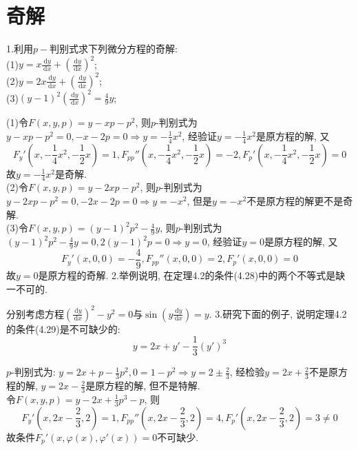 \documentclass[titlepage,11pt,a4paper,twoside]{report}
\makeatletter
\newcommand\diff{\,\mathrm{d}}
\newenvironment{solve}{\par
	\pushQED{\qed}%
	\normalfont \topsep1\p@\@plus6\p@\relax
	\trivlist
	\item\relax
	{\hspace*{\parindent}{\heiti 解}\@addpunct{:}}\hspace\labelsep\ignorespaces
}{%
	\popQED\endtrivlist\@endpefalse
}
\makeatother
\begin{document}
\section{奇解}
1.利用$p-$判别式求下列微分方程的奇解:\\
(1)$\displaystyle y=x\frac{\diff y}{\diff x}+\left(\frac{\diff y}{\diff x}\right)^2$;\\
(2)$\displaystyle y=2x\frac{\diff y}{\diff x}+\left(\frac{\diff y}{\diff x}\right)^2$;\\
(3)$\displaystyle (y-1)^2\left(\frac{\diff y}{\diff x}\right)^2=\frac{4}{9}y$;
\begin{solve} 
(1)令$F(x,y,p)=y-xp-p^2$, 则$p$-判别式为$y-xp-p^2=0,-x-2p=0\Rightarrow y=-\frac{1}{4}x^2$, 经验证$y=-\frac{1}{4}x^2$是原方程的解, 又
\[F_y'\left(x,-\frac{1}{4}x^2,-\frac{1}{2}x\right)=1,F_{pp}''\left(x,-\frac{1}{4}x^2,-\frac{1}{2}x\right)=-2,F_p'\left(x,-\frac{1}{4}x^2,-\frac{1}{2}x\right)=0\]
故$y=-\frac{1}{4}x^2$是奇解.\\
(2)令$F(x,y,p)=y-2xp-p^2$, 则$p$-判别式为$y-2xp-p^2=0,-2x-2p=0\Rightarrow y=-x^2$, 但是$y=-x^2$不是原方程的解更不是奇解.\\
(3)令$F(x,y,p)=(y-1)^2p^2-\frac{4}{9}y$, 则$p$-判别式为$(y-1)^2p^2-\frac{4}{9}y=0,2(y-1)^2p=0\Rightarrow y=0$, 经验证$y=0$是原方程的解, 又
\[F_y'(x,0,0)=-\frac{4}{9},F_{pp}''(x,0,0)=2,F_p'(x,0,0)=0\]
故$y=0$是原方程的奇解.
\end{solve}
2.举例说明, 在定理4.2的条件(4.28)中的两个不等式是缺一不可的.
\begin{solve}  
分别考虑方程$\displaystyle\left(\frac{\diff y}{\diff x}\right)^2-y^2=0$与$\displaystyle\sin\left(y\frac{\diff y}{\diff x}\right)=y$.
\end{solve}
3.研究下面的例子, 说明定理4.2的条件(4.29)是不可缺少的:
\[y=2x+y'-\frac{1}{3}(y')^3\]
\begin{solve} 
$p$-判别式为: $y=2x+p-\frac{1}{3}p^2,0=1-p^2\Rightarrow y=2\pm\frac{2}{3}$, 经检验$y=2x+\frac{2}{3}$不是原方程的解, $y=2x-\frac{2}{3}$是原方程的解, 但不是特解.\\
令$F(x,y,p)=y-2x+\frac{1}{3}p^3-p$, 则
\[F_y'\left(x,2x-\frac{2}{3},2\right)=1,F_{pp}''\left(x,2x-\frac{2}{3},2\right)=4,F_p'\left(x,2x-\frac{2}{3},2\right)=3\neq0\]
故条件$F_p'(x,\varphi(x),\varphi'(x))=0$不可缺少.
\end{solve}
\end{document}

